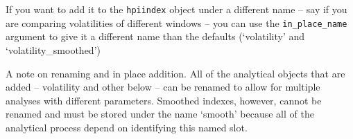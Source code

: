 \documentclass[]{article}
\newenvironment{Shaded}{\begin{snugshade}}{\end{snugshade}}
\newcommand{\KeywordTok}[1]{\textcolor[rgb]{0.13,0.29,0.53}{\textbf{#1}}}
\newcommand{\DataTypeTok}[1]{\textcolor[rgb]{0.13,0.29,0.53}{#1}}
\newcommand{\DecValTok}[1]{\textcolor[rgb]{0.00,0.00,0.81}{#1}}
\newcommand{\StringTok}[1]{\textcolor[rgb]{0.31,0.60,0.02}{#1}}
\newcommand{\OtherTok}[1]{\textcolor[rgb]{0.56,0.35,0.01}{#1}}
\newcommand{\OperatorTok}[1]{\textcolor[rgb]{0.81,0.36,0.00}{\textbf{#1}}}
\newcommand{\NormalTok}[1]{#1}
\begin{document}
\begin{Shaded}
\end{Shaded}

If you want to add it to the \texttt{hpiindex} object under a different
name -- say if you are comparing volatilities of different windows --
you can use the \texttt{in\_place\_name} argument to give it a different
name than the defaults (`volatility' and `volatility\_smoothed')

\begin{Shaded}
\end{Shaded}

A note on renaming and in place addition. All of the analytical objects
that are added -- volatility and other below -- can be renamed to allow
for multiple analyses with different parameters. Smoothed indexes,
however, cannot be renamed and must be stored under the name `smooth'
because all of the analytical process depend on identifying this named
slot.
\end{document}
